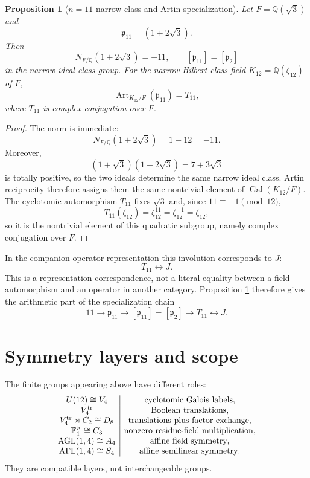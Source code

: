 \documentclass[11pt]{article}
\newtheorem{proposition}[theorem]{Proposition}
\theoremstyle{remark}
\newcommand{\Q}{\mathbb Q}
\newcommand{\F}{\mathbb F}
\newcommand{\Gal}{\operatorname{Gal}}
\newcommand{\Art}{\operatorname{Art}}
\begin{document}
\begin{proposition}[$n=11$ narrow-class and Artin specialization]
\label{prop:n11}
Let $F=\Q(\sqrt3)$ and
\[
\mathfrak p_{11}=(1+2\sqrt3).
\]
Then
\[
N_{F/\Q}(1+2\sqrt3)=-11,
\qquad
[\mathfrak p_{11}]=[\mathfrak p_2]
\]
in the narrow ideal class group.  For the narrow Hilbert class field
$K_{12}=\Q(\zeta_{12})$ of $F$,
\[
\boxed{\Art_{K_{12}/F}(\mathfrak p_{11})=T_{11},}
\]
where $T_{11}$ is complex conjugation over $F$.
\end{proposition}
\begin{proof}
The norm is immediate:
\[
N_{F/\Q}(1+2\sqrt3)=1-12=-11.
\]
Moreover,
\[
(1+\sqrt3)(1+2\sqrt3)=7+3\sqrt3
\]
is totally positive, so the two ideals determine the same narrow ideal class.
Artin reciprocity therefore assigns them the same nontrivial element of
$\Gal(K_{12}/F)$.  The cyclotomic automorphism $T_{11}$ fixes $\sqrt3$ and,
since $11\equiv-1\pmod{12}$,
\[
T_{11}(\zeta_{12})=\zeta_{12}^{11}=\zeta_{12}^{-1}
=\overline{\zeta_{12}},
\]
so it is the nontrivial element of this quadratic subgroup, namely complex
conjugation over $F$.
\end{proof}

In the companion operator representation this involution corresponds to $J$:
\[
\boxed{T_{11}\longleftrightarrow J.}
\]
This is a representation correspondence, not a literal equality between a
field automorphism and an operator in another category.  Proposition
\ref{prop:n11} therefore gives the arithmetic part of the specialization chain
\[
\boxed{
11\longrightarrow\mathfrak p_{11}
\longrightarrow[\mathfrak p_{11}]=[\mathfrak p_2]
\longrightarrow T_{11}\longleftrightarrow J.}
\]

\section{Symmetry layers and scope}

The finite groups appearing above have different roles:
\[
\begin{array}{c|c}
U(12)\cong V_4 & \text{cyclotomic Galois labels},\\
V_4^{\rm tr} & \text{Boolean translations},\\
V_4^{\rm tr}\rtimes C_2\cong D_8 & \text{translations plus factor exchange},\\
\F_4^\times\cong C_3 & \text{nonzero residue-field multiplication},\\
\operatorname{AGL}(1,4)\cong A_4 & \text{affine field symmetry},\\
\operatorname{A\Gamma L}(1,4)\cong S_4 & \text{affine semilinear symmetry}.
\end{array}
\]
They are compatible layers, not interchangeable groups.
\end{document}
